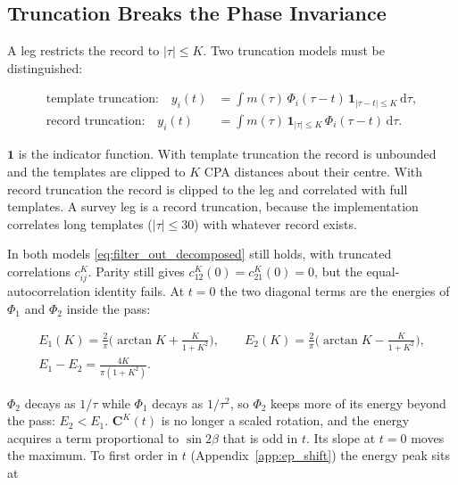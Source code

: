 \subsection{Truncation Breaks the Phase Invariance}\label{subsec:truncation}

A leg restricts the record to $|\tau| \leq K$. Two truncation models must be distinguished:

\begin{equation}
\begin{aligned}
\text{template truncation:}\quad y_i(t) &= \int m(\tau)\,\Phi_i(\tau - t)\,\mathbf{1}_{|\tau - t| \leq K}\,\mathrm{d}\tau, \\
\text{record truncation:}\quad y_i(t) &= \int m(\tau)\,\mathbf{1}_{|\tau| \leq K}\,\Phi_i(\tau - t)\,\mathrm{d}\tau.
\end{aligned}
\label{eq:truncation_models}
\end{equation}

$\mathbf{1}$ is the indicator function. With template truncation the record is unbounded and the templates are clipped to $K$ CPA distances about their centre. With record truncation the record is clipped to the leg and correlated with full templates. A survey leg is a record truncation, because the implementation correlates long templates ($|\tau| \leq 30$) with whatever record exists.

In both models \eqref{eq:filter_out_decomposed} still holds, with truncated correlations $c_{ij}^{K}$. Parity still gives $c_{12}^{K}(0) = c_{21}^{K}(0) = 0$, but the equal-autocorrelation identity fails. At $t = 0$ the two diagonal terms are the energies of $\Phi_1$ and $\Phi_2$ inside the pass:

\begin{equation}
\begin{gathered}
E_1(K) = \frac{2}{\pi}\Big(\arctan K + \frac{K}{1+K^2}\Big), \qquad E_2(K) = \frac{2}{\pi}\Big(\arctan K - \frac{K}{1+K^2}\Big),\\
E_1 - E_2 = \frac{4K}{\pi(1+K^2)}.
\end{gathered}
\label{eq:trunc_energy_diff}
\end{equation}

$\Phi_2$ decays as $1/\tau$ while $\Phi_1$ decays as $1/\tau^2$, so $\Phi_2$ keeps more of its energy beyond the pass: $E_2 < E_1$. $\mathbf{C}^K(t)$ is no longer a scaled rotation, and the energy acquires a term proportional to $\sin 2\beta$ that is odd in $t$. Its slope at $t = 0$ moves the maximum. To first order in $t$ (Appendix~\ref{app:ep_shift}) the energy peak sits at

